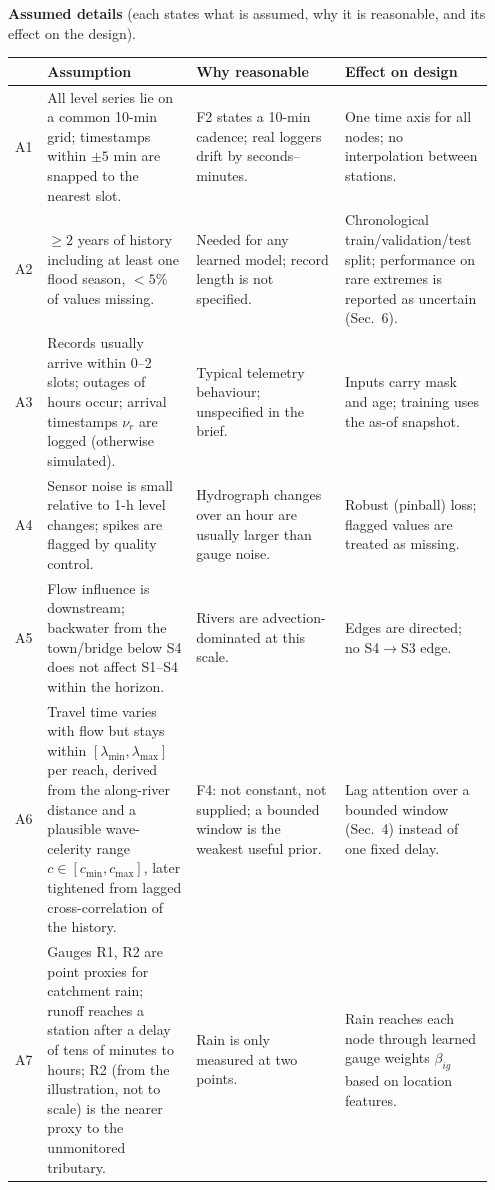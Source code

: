 \medskip
\noindent\textbf{Assumed details} (each states what is assumed, why it is reasonable, and its effect on the design).
\small
\begin{longtable}{@{}p{0.05\linewidth}p{0.30\linewidth}p{0.30\linewidth}p{0.30\linewidth}@{}}
\toprule
 & \textbf{Assumption} & \textbf{Why reasonable} & \textbf{Effect on design}\\ \midrule\endhead
A1 & All level series lie on a common 10-min grid; timestamps within $\pm5$ min are snapped to the nearest slot. & F2 states a 10-min cadence; real loggers drift by seconds--minutes. & One time axis for all nodes; no interpolation between stations.\\
A2 & $\geq 2$ years of history including at least one flood season, $<5\%$ of values missing. & Needed for any learned model; record length is not specified. & Chronological train/validation/test split; performance on rare extremes is reported as uncertain (Sec.~6).\\
A3 & Records usually arrive within 0--2 slots; outages of hours occur; arrival timestamps $\nu_r$ are logged (otherwise simulated). & Typical telemetry behaviour; unspecified in the brief. & Inputs carry mask and age; training uses the as-of snapshot.\\
A4 & Sensor noise is small relative to 1-h level changes; spikes are flagged by quality control. & Hydrograph changes over an hour are usually larger than gauge noise. & Robust (pinball) loss; flagged values are treated as missing.\\
A5 & Flow influence is downstream; backwater from the town/bridge below S4 does not affect S1--S4 within the horizon. & Rivers are advection-dominated at this scale. & Edges are directed; no S4$\to$S3 edge.\\
A6 & Travel time varies with flow but stays within $[\lambda_{\min},\lambda_{\max}]$ per reach, derived from the along-river distance and a plausible wave-celerity range $c\in[c_{\min},c_{\max}]$, later tightened from lagged cross-correlation of the history. & F4: not constant, not supplied; a bounded window is the weakest useful prior. & Lag attention over a bounded window (Sec.~4) instead of one fixed delay.\\
A7 & Gauges R1, R2 are point proxies for catchment rain; runoff reaches a station after a delay of tens of minutes to hours; R2 (from the illustration, not to scale) is the nearer proxy to the unmonitored tributary. & Rain is only measured at two points. & Rain reaches each node through learned gauge weights $\beta_{ig}$ based on location features.\\

\end{longtable}
